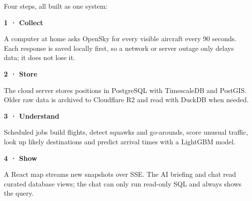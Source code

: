 \documentclass[10.5pt]{article}
\begin{document}
\newpage
\pagecolor{paper}
\color{papertext}


{\small
Four steps, all built as one system:
}

\vspace{2pt}
\begin{minipage}[t]{0.235\linewidth}
\begin{card}
{\color{accent}\bfseries 1 · Collect}

\vspace{2pt}
{\footnotesize A computer at home asks OpenSky for every visible aircraft every 90 seconds. Each response is saved locally first, so a network or server outage only delays data; it does not lose it.}
\end{card}
\end{minipage}\hfill
\begin{minipage}[t]{0.235\linewidth}
\begin{card}
{\color{accent}\bfseries 2 · Store}

\vspace{2pt}
{\footnotesize The cloud server stores positions in PostgreSQL with TimescaleDB and PostGIS. Older raw data is archived to Cloudflare R2 and read with DuckDB when needed.}
\end{card}
\end{minipage}\hfill
\begin{minipage}[t]{0.235\linewidth}
\begin{card}
{\color{accent}\bfseries 3 · Understand}

\vspace{2pt}
{\footnotesize Scheduled jobs build flights, detect squawks and go-arounds, score unusual traffic, look up likely destinations and predict arrival times with a LightGBM model.}
\end{card}
\end{minipage}\hfill
\begin{minipage}[t]{0.235\linewidth}
\begin{card}
{\color{accent}\bfseries 4 · Show}

\vspace{2pt}
{\footnotesize A React map streams new snapshots over SSE. The AI briefing and chat read curated database views; the chat can only run read-only SQL and always shows the query.}
\end{card}
\end{minipage}
\end{document}
